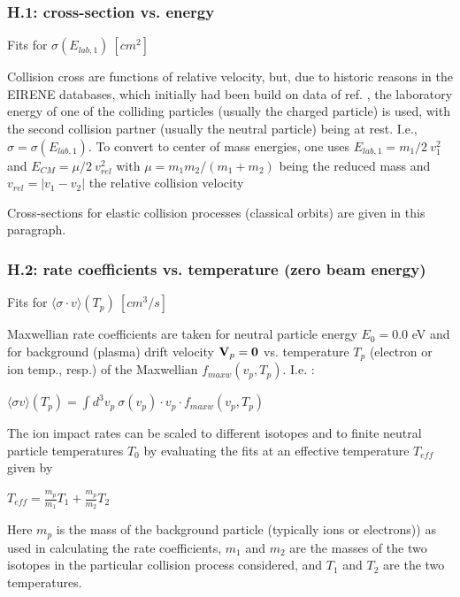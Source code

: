 \documentclass[12pt,dvips]{article}
\begin{document}
\subsubsection*{H.1: cross-section vs. energy}\label{sec1.3.1}
Fits for $\sigma  (E_{lab,1}) \ [cm^2]$

Collision cross are functions of relative velocity, but, due to historic reasons
in the EIRENE databases, which initially had been build on data of ref. \cite{kn:Janev}, the laboratory energy  of one of the colliding particles (usually the charged particle)
is used, with the second collision partner (usually the neutral particle) being at rest. I.e., $\sigma= \sigma(E_{lab,1})$.
To convert to center of mass energies, one uses $E_{lab,1} =m_1/2 \ v_1^2$ and $E_{CM} = \mu/2 \ v_{rel}^2$ with
$\mu = m_1m_2/(m_1+m_2)$ being the reduced mass and $v_{rel}=|v_1-v_2|$ the relative collision velocity

Cross-sections for elastic collision processes (classical orbits) are given in this paragraph.


\subsubsection*{H.2: rate coefficients vs. temperature (zero beam energy)}\label{sec1.3.2}
Fits for $\langle\sigma \cdot v  \rangle (T_p) \ [cm^3/s]$

Maxwellian rate coefficients are taken for neutral particle energy $E_0 = 0.0$ eV and for background (plasma) drift velocity ${\bf V}_p ={\bf 0}$
vs. temperature $T_p$ (electron or ion temp., resp.) of the Maxwellian $f_{maxw}(v_p,T_p)$.
I.e. :

$\langle\sigma v \rangle(T_p) = \int d^3v_p \ \sigma(v_{p}) \cdot v_{p} \cdot
f_{maxw}(v_{p},T_p)$

The ion impact rates can be scaled to different isotopes and to finite
neutral particle temperatures $T_0$ by evaluating the fits at an
effective temperature $T_{eff}$ given by

$T_{eff} = \frac {m_p}{m_1} T_1 + \frac{m_p}{m_2} T_2 $

Here $m_p$ is the mass of the background particle (typically ions or electrons)) as used in calculating the rate coefficients,
$m_1$ and $m_2$ are the masses of the two isotopes in the particular collision
process considered, and $T_1$ and $T_2$ are the two temperatures.
\end{document}

